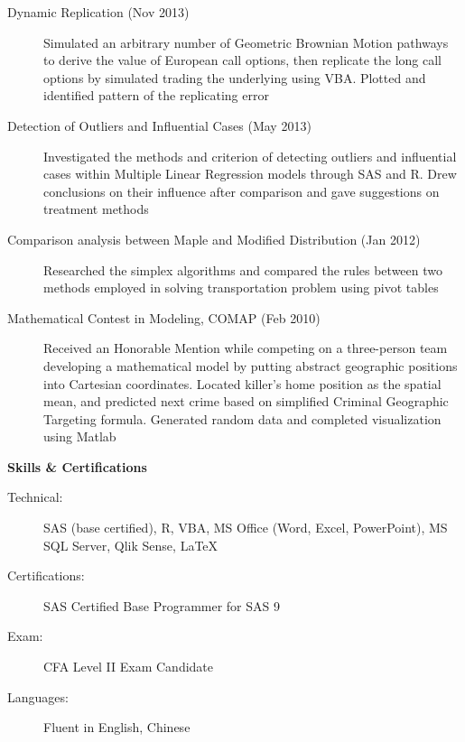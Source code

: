 \documentclass[a4paper,10pt]{article}
\newcommand{\resheading}[1]{{\large \colorbox{mygrey}{\begin{minipage}{\textwidth}{\textbf{#1\vphantom{p\^{E}}}}\end{minipage}}}}
\begin{document}
\begin{description}

\item[Dynamic Replication (Nov 2013)] 
Simulated an arbitrary number of Geometric Brownian Motion pathways to derive the value of European call options, then replicate the long call options by simulated trading the underlying using VBA. Plotted and identified pattern of the replicating error

\item[Detection of Outliers and Influential Cases (May 2013)] 
Investigated the methods and criterion of detecting outliers and influential cases within Multiple Linear Regression models through SAS and R. Drew conclusions on their influence after comparison and gave suggestions on treatment methods 

\item[Comparison analysis between Maple and Modified Distribution (Jan 2012)] 
Researched the simplex algorithms and compared the rules between two methods employed in solving transportation problem using pivot tables


\item[Mathematical Contest in Modeling, COMAP (Feb 2010)] 
Received an Honorable Mention while competing on a three-person team developing a mathematical model by putting abstract geographic positions into Cartesian coordinates. Located killer's home position as the spatial mean, and predicted next crime based on simplified Criminal Geographic Targeting formula. Generated random data and completed visualization using Matlab


\end{description}



\resheading{Skills \& Certifications}

\begin{description}

\item[Technical:]
SAS (base certified), R, VBA, MS Office (Word, Excel, PowerPoint), MS SQL Server, Qlik Sense, LaTeX
\item[Certifications:]
SAS Certified Base Programmer for SAS 9
\item[Exam:]
CFA Level II Exam Candidate
\item[Languages:]
Fluent in English, Chinese

\end{description}
\end{document}
